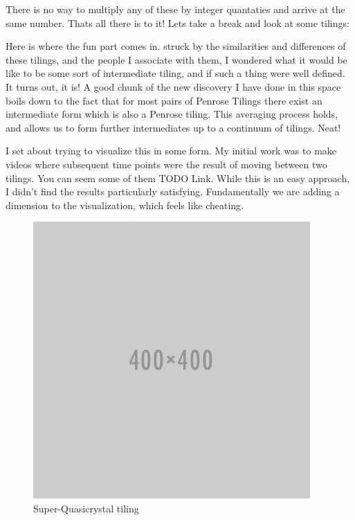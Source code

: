 \documentclass{amsart}
\begin{document}
There is no way to multiply any of these by integer quantaties and arrive at the same number. Thats all there is to it! Lets take a break and look at some tilings:


Here is where the fun part comes in. struck by the similarities and differences of these tilings, and the people I
associate with them, I wondered what it would be like to be some sort of intermediate tiling, and if such a thing 
were well defined. It turns out, it is! A good chunk of the new discovery I have done in this space boils down to
the fact that for most pairs of Penrose Tilings there exist an intermediate form which is also a Penrose tiling.
This averaging process holds, and allows us to form further intermediates up to a continuum of tilings. Neat! 

I set about trying to visualize this in some form. My initial work was to make videos where subsequent time points were
the result of moving between two tilings. You can seem some of them TODO Link. While this is an easy approach, I didn’t
find the results particularly satisfying. Fundamentally we are adding a dimension to the visualization, which feels like
cheating.


\begin{figure}[h]
  \centering
  \includegraphics[width=0.8\linewidth]{figures/placeholder}
  \caption{Super-Quasicrystal tiling}
  \label{fig:gm-tiling}
\end{figure}
\end{document}

